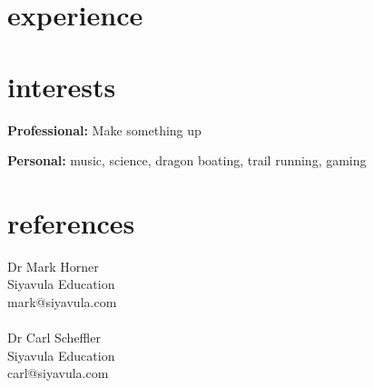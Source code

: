 \documentclass[]{friggeri-cv} %
\begin{document}
\section{experience}
\begin{entrylist}
\end{entrylist}

\section{interests}

\textbf{Professional:} Make something up

\textbf{Personal:} music, science, dragon boating, trail running, gaming


\section{references}

Dr Mark Horner\\
Siyavula Education\\
mark@siyavula.com\\
\\
Dr Carl Scheffler\\
Siyavula Education\\
carl@siyavula.com\\
\end{document}

